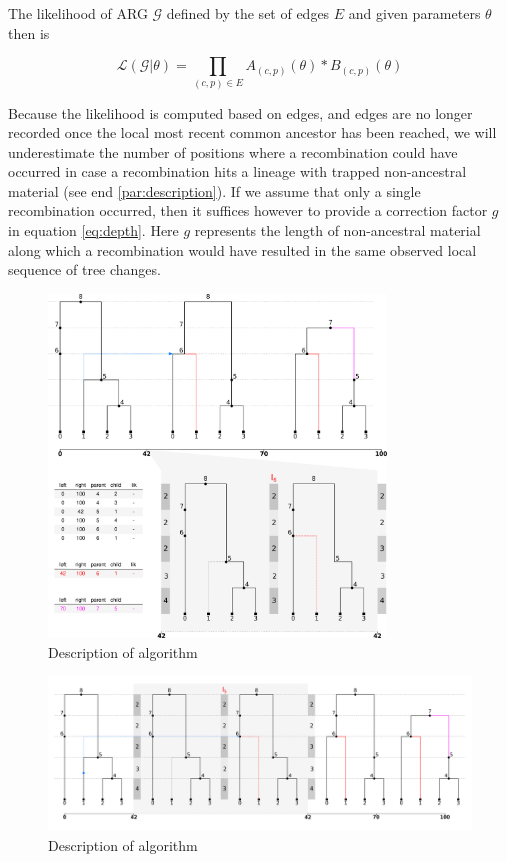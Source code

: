 \documentclass{article}
\begin{document}
The likelihood of ARG $\mathcal{G}$ defined by the set of edges $E$ and
given parameters $\theta$ then is

\begin{equation}\label{eq:full-lik}
\mathcal{L}(\mathcal{G}|\theta) = \prod_{(c, p) \in E} A_{(c, p)}(\theta) * B_{(c, p)}(\theta)
\end{equation}


Because the likelihood is computed based on edges,
and edges are no longer recorded once the local most recent common ancestor 
has been reached, we will underestimate the number of positions where 
a recombination could have occurred in case a recombination hits a 
lineage with trapped non-ancestral material (see end \ref{par:description}). 
If we assume that only a single recombination 
occurred, then it suffices however to provide a correction factor $g$ in equation
\ref{eq:depth}. Here $g$ represents the 
length of non-ancestral material along which a recombination would have resulted  
in the same observed local sequence of tree changes.


\begin{figure}[h!] \label{fig:algo}
\centering
\includegraphics[width=0.8\textwidth]{figures/smc_algo.png}
\caption{Description of algorithm}
\end{figure}

\begin{figure}[h!] \label{fig:algo-flat}
\centering
\includegraphics[width=\textwidth]{figures/smc_algo_flat.png}
\caption{Description of algorithm}
\end{figure}
\end{document}
